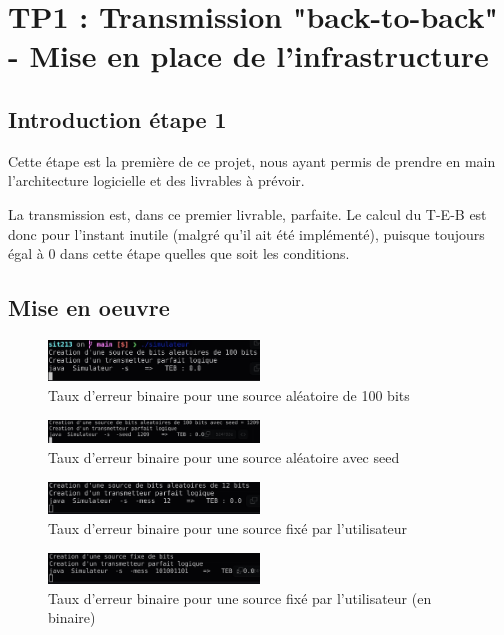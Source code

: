 \section{TP1 : Transmission "back-to-back" - Mise en place de l'infrastructure}

\subsection{Introduction étape 1}


Cette étape est la première de ce projet, nous ayant permis de prendre en main l'architecture logicielle et des livrables à prévoir.

La transmission est, dans ce premier livrable, parfaite. Le calcul du T-E-B est donc pour l'instant inutile (malgré qu'il ait été implémenté), puisque toujours égal à 0 dans cette étape quelles que soit les conditions.

\subsection{Mise en oeuvre}


\begin{figure}[H]
    \centering
    \includegraphics[width=0.5\textwidth]{img/teb1.jpg}
    \caption{Taux d'erreur binaire pour une source aléatoire de 100 bits}
    \label{fig:teb1}
\end{figure}
\begin{figure}[H]
    \centering
    \includegraphics[width=0.5\textwidth]{img/teb3.jpg}
    \caption{Taux d'erreur binaire pour une source aléatoire avec seed}
    \label{fig:teb2}
\end{figure}
\begin{figure}[H]
    \centering
    \includegraphics[width=0.5\textwidth]{img/teb2.jpg}
    \caption{Taux d'erreur binaire pour une source fixé par l'utilisateur}
    \label{fig:teb3}
\end{figure}
\begin{figure}[H]
    \centering
    \includegraphics[width=0.5\textwidth]{img/teb4.jpg}
    \caption{Taux d'erreur binaire pour une source fixé par l'utilisateur (en binaire)}
    \label{fig:teb4}
\end{figure}


